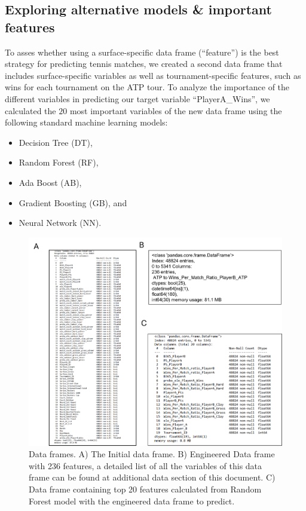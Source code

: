 \documentclass[preprint,aps,nofootinbib,a4paper,superscriptaddress,longbibliography,amsfonts,amssymb,amsmath,titlepage]{revtex4-2}
\begin{document}
\subsection{Exploring alternative models \& important features}

To asses whether using a surface-specific data frame (``feature'') is the best strategy for predicting tennis matches, we created a second data frame that includes surface-specific variables as well as tournament-specific features, such as wins for each tournament on the ATP tour. To analyze the importance of the different variables in predicting our target variable ``PlayerA\_Wins'', we calculated the $20$ most important variables of the new data frame using the following standard machine learning models:
%
\begin{itemize}
\item Decision Tree (DT),
\item Random Forest (RF),
\item Ada Boost (AB),
\item Gradient Boosting (GB), and
\item Neural Network (NN).
\end{itemize}

\begin{figure}[h]
\includegraphics[width=\textwidth]{pictures/dataframes-patrick.png}
\caption{Data frames. A)  The Initial data frame. B) Engineered Data frame with 236 features, a detailed list of all the variables of this data frame can be found at additional data section of this document. C) Data frame containing top 20 features calculated from Random Forest model with the engineered data frame to predict.}
\label{dataframes-patrick}
\end{figure}
%
\end{document}
